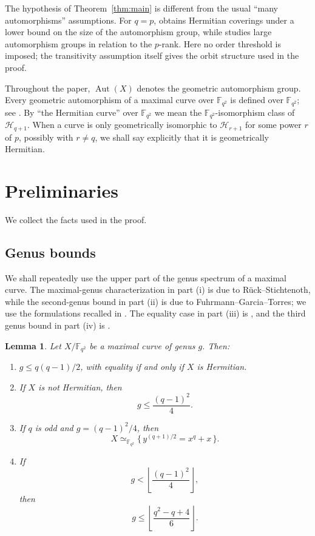 \documentclass[11pt]{amsart}
\newtheorem{lemma}[theorem]{Lemma}
\theoremstyle{remark}
\newcommand{\F}{\mathbb F}
\newcommand{\Aut}{\operatorname{Aut}}
\newcommand{\cH}{\mathcal H}
\begin{document}
The hypothesis of Theorem~\ref{thm:main} is different from the usual
``many automorphisms'' assumptions.  For $q=p$, \cite{BMT} obtains
Hermitian coverings under a lower bound on the size of the automorphism
group, while \cite{GK2019} studies large automorphism groups in relation
to the $p$-rank.  Here no order threshold is imposed; the transitivity
assumption itself gives the orbit structure used in the proof.

Throughout the paper, $\Aut(X)$ denotes the geometric automorphism
group.  Every geometric automorphism of a maximal curve over
$\F_{q^2}$ is defined over $\F_{q^2}$; see \cite[Theorem~3.10]{GSY}.
By ``the Hermitian curve'' over $\F_{q^2}$ we mean the
$\F_{q^2}$-isomorphism class of $\cH_{q+1}$.  When a curve is only
geometrically isomorphic to $\cH_{r+1}$ for some power $r$ of $p$,
possibly with $r\ne q$, we shall say explicitly that it is
geometrically Hermitian.

\section{Preliminaries}

We collect the facts used in the proof.

\subsection{Genus bounds}

We shall repeatedly use the upper part of the genus spectrum of a
maximal curve.  The maximal-genus characterization in part \textup{(i)}
is due to R\"uck--Stichtenoth, while the second-genus bound in part
\textup{(ii)} is due to Fuhrmann--Garcia--Torres; we use the formulations
recalled in \cite[Lemma~2.12 and Corollary~2.13]{KT}.  The equality case
in part \textup{(iii)} is \cite[Theorem~3.1]{FGT}, and the third genus
bound in part \textup{(iv)} is \cite[Corollary~3.3]{KT}.

\begin{lemma}\label{lem:gaps}
Let $X/\F_{q^2}$ be a maximal curve of genus $g$.
Then:
\begin{enumerate}[label=\textup{(\roman*)}]
\item
$g\le q(q-1)/2$, with equality if and only if $X$ is Hermitian.

\item If $X$ is not Hermitian, then
\[
g\le \frac{(q-1)^2}{4}.
\]

\item If $q$ is odd and $g=(q-1)^2/4$, then
\[
X\simeq_{\F_{q^2}}\{\,y^{(q+1)/2}=x^q+x\,\}.
\]

\item If
\[
g<\left\lfloor\frac{(q-1)^2}{4}\right\rfloor,
\]
then
\[
g\le\left\lfloor\frac{q^2-q+4}{6}\right\rfloor.
\]
\end{enumerate}
\end{lemma}
\end{document}

